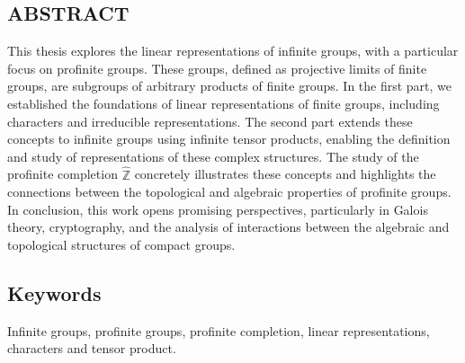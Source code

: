 \documentclass[a4paper, 14pt]{report}
\newcommand{\applyfontsize}{%
	\fontsize{12}{12}\selectfont
}
\begin{document}
\begin{onehalfspace}
		\chapter*{ABSTRACT}
		{
			\applyfontsize %
			This thesis explores the linear representations of infinite groups, with a particular focus on profinite groups. These groups, defined as projective limits of finite groups, are subgroups of arbitrary products of finite groups. In the first part, we established the foundations of linear representations of finite groups, including characters and irreducible representations. The second part extends these concepts to infinite groups using infinite tensor products, enabling the definition and study of representations of these complex structures. The study of the profinite completion \( \widehat{\mathbb{Z}} \)
			concretely illustrates these concepts and highlights the connections between the topological and algebraic properties of profinite groups. In conclusion, this work opens promising perspectives, particularly in Galois theory, cryptography, and the analysis of interactions between the algebraic and topological structures of compact groups.
			
			
			
			\section*{Keywords}
			Infinite groups, profinite groups, profinite completion, linear representations, characters and tensor product.
			
		}
		
		
		
		
		

\end{onehalfspace}
\end{document}
